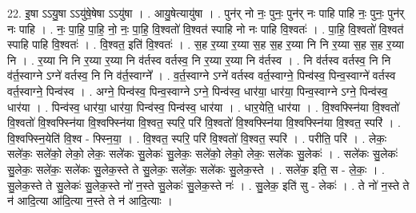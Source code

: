 \documentclass[17pt]{extarticle}
\begin{document}
22. इ॒षा ऽऽयु॒षा ऽऽयु॑षे॒षेषा ऽऽयु॑षा । . आयु॒षेत्यायु॑षा । . पुन॑र् नो नः॒ पुनः॒ पुन॑र् नः पाहि पाहि नः॒ पुनः॒ पुन॑र् नः पाहि । . नः॒ पा॒हि॒ पा॒हि॒ नो॒ नः॒ पा॒हि॒ वि॒श्वतो॑ वि॒श्वत॑ स्पाहि नो नः पाहि वि॒श्वतः॑ । . पा॒हि॒ वि॒श्वतो॑ वि॒श्वत॑ स्पाहि पाहि वि॒श्वतः॑ । . वि॒श्वत॒ इति॑ वि॒श्वतः॑ । . स॒ह र॒य्या र॒य्या स॒ह स॒ह र॒य्या नि नि र॒य्या स॒ह स॒ह र॒य्या नि । . र॒य्या नि नि र॒य्या र॒य्या नि व॑र्तस्व वर्तस्व॒ नि र॒य्या र॒य्या नि व॑र्तस्व । . नि व॑र्तस्व वर्तस्व॒ नि नि व॑र्त॒स्वाग्ने ऽग्ने॑ वर्तस्व॒ नि नि व॑र्त॒स्वाग्ने᳚ । . व॒र्त॒स्वाग्ने ऽग्ने॑ वर्तस्व वर्त॒स्वाग्ने॒ पिन्व॑स्व॒ पिन्व॒स्वाग्ने॑ वर्तस्व वर्त॒स्वाग्ने॒ पिन्व॑स्व । . अग्ने॒ पिन्व॑स्व॒ पिन्व॒स्वाग्ने ऽग्ने॒ पिन्व॑स्व॒ धार॑या॒ धार॑या॒ पिन्व॒स्वाग्ने ऽग्ने॒ पिन्व॑स्व॒ धार॑या । . पिन्व॑स्व॒ धार॑या॒ धार॑या॒ पिन्व॑स्व॒ पिन्व॑स्व॒ धार॑या । . धार॒येति॒ धार॑या । . वि॒श्वफ्स्नि॑या वि॒श्वतो॑ वि॒श्वतो॑ वि॒श्वफ्स्नि॑या वि॒श्वफ्स्नि॑या वि॒श्वत॒ स्परि॒ परि॑ वि॒श्वतो॑ वि॒श्वफ्स्नि॑या वि॒श्वफ्स्नि॑या वि॒श्वत॒ स्परि॑ । . वि॒श्वफ्स्नि॒येति॑ वि॒श्व - फ्स्नि॒या॒ । . वि॒श्वत॒ स्परि॒ परि॑ वि॒श्वतो॑ वि॒श्वत॒ स्परि॑ । . परीति॒ परि॑ । . लेकः॒ सले॑कः॒ सले॑को॒ लेको॒ लेकः॒ सले॑कः सु॒लेकः॑ सु॒लेकः॒ सले॑को॒ लेको॒ लेकः॒ सले॑कः सु॒लेकः॑ । . सले॑कः सु॒लेकः॑ सु॒लेकः॒ सले॑कः॒ सले॑कः सु॒लेक॒स्ते ते सु॒लेकः॒ सले॑कः॒ सले॑कः सु॒लेक॒स्ते । . सले॑क॒ इति॒ स - ले॒कः॒ । . सु॒लेक॒स्ते ते सु॒लेकः॑ सु॒लेक॒स्ते नो॑ न॒स्ते सु॒लेकः॑ सु॒लेक॒स्ते नः॑ । . सु॒लेक॒ इति॑ सु - लेकः॑ । . ते नो॑ न॒स्ते ते न॑ आदि॒त्या आ॑दि॒त्या न॒स्ते ते न॑ आदि॒त्याः । \newline
\end{document}
